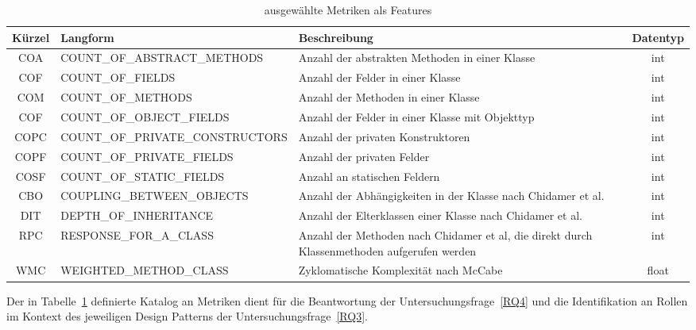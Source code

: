 \begin{table}[H]
    \begin{tabular}{|c|p{0,45\linewidth}|p{0,35\linewidth}|c|}
        \hline
        Kürzel & Langform &Beschreibung & Datentyp\\
        \hline
        COA & COUNT\_OF\_ABSTRACT\_METHODS & Anzahl der abstrakten Methoden in einer Klasse & int\\
        COF & COUNT\_OF\_FIELDS & Anzahl der Felder in einer Klasse & int\\
        COM & COUNT\_OF\_METHODS & Anzahl der Methoden in einer Klasse & int\\
        COF & COUNT\_OF\_OBJECT\_FIELDS & Anzahl der Felder in einer Klasse mit Objekttyp & int\\
        COPC & COUNT\_OF\_PRIVATE\_CONSTRUCTORS & Anzahl der privaten Konstruktoren & int\\
        COPF & COUNT\_OF\_PRIVATE\_FIELDS & Anzahl der privaten Felder & int\\
        COSF & COUNT\_OF\_STATIC\_FIELDS & Anzahl an statischen Feldern & int\\
        CBO & COUPLING\_BETWEEN\_OBJECTS & Anzahl der Abhängigkeiten in der Klasse nach Chidamer et al. & int\\
        DIT & DEPTH\_OF\_INHERITANCE & Anzahl der Elterklassen einer Klasse nach Chidamer et al. & int\\
        RPC & RESPONSE\_FOR\_A\_CLASS & Anzahl der Methoden nach Chidamer et al, die direkt durch Klassenmethoden aufgerufen werden & int\\
        WMC & WEIGHTED\_METHOD\_CLASS & Zyklomatische Komplexität nach McCabe~\cite{mccabe1976complexity} & float\\
        \hline
    \end{tabular}
    \caption{ausgewählte Metriken als Features}
    \label{tab:features}
\end{table}

Der in Tabelle~\ref{tab:features} definierte Katalog an Metriken dient für die Beantwortung der Untersuchungsfrage~\ref{RQ4} und die Identifikation an Rollen im Kontext des jeweiligen Design Patterns der Untersuchungsfrage~\ref{RQ3}.



